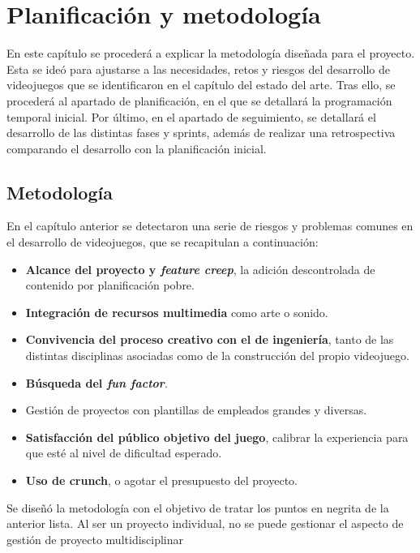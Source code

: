 \chapter{Planificación y metodología}

En este capítulo se procederá a explicar la metodología diseñada para el proyecto. Esta se ideó para ajustarse a las necesidades, retos y riesgos del desarrollo de videojuegos que se identificaron en el capítulo del estado del arte. Tras ello, se procederá al apartado de planificación, en el que se detallará la programación temporal inicial. Por último, en el apartado de seguimiento, se detallará el desarrollo de las distintas fases y sprints, además de realizar una retrospectiva comparando el desarrollo con la planificación inicial.

\section{Metodología}

En el capítulo anterior se detectaron una serie de riesgos y problemas comunes en el desarrollo de videojuegos, que se recapitulan a continuación:

\begin{itemize}
    \item \textbf{Alcance del proyecto y \textit{feature creep}}, la adición descontrolada de contenido por planificación pobre.
    \item \textbf{Integración de recursos multimedia} como arte o sonido.
    \item \textbf{Convivencia del proceso creativo con el de ingeniería}, tanto de las distintas disciplinas asociadas como de la construcción del propio videojuego.
    \item \textbf{Búsqueda del \textit{fun factor}}.
    \item Gestión de proyectos con plantillas de empleados grandes y diversas.
    \item \textbf{Satisfacción del público objetivo del juego}, calibrar la experiencia para que esté al nivel de dificultad esperado.
    \item \textbf{Uso de crunch}, o agotar el presupuesto del proyecto.
\end{itemize}

Se diseñó la metodología con el objetivo de tratar los puntos en negrita de la anterior lista. Al ser un proyecto individual, no se puede gestionar el aspecto de gestión de proyecto multidisciplinar 

